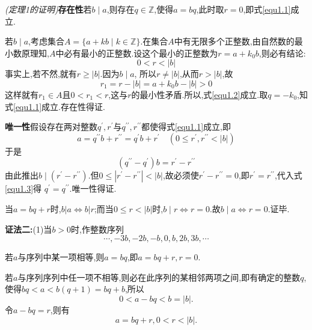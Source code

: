 \proof \textit{(定理1的证明)}\textbf{存在性}\quad 若$b \mid a$,则存在$q \in \mathbb{Z}$,使得$a=b q$,此时取$r=0$,即式\eqref{equ1.1}成立.

若$b\mid a$,考虑集合$A=\{a+k b \mid k \in \mathbb{Z}\}$.在集合$A$中有无限多个正整数,由自然数的最小数原理知,$A$中必有最小的正整数.设这个最小的正整数为$r=a+k_{0} b$,则必有结论:
\begin{equation}\label{equ1.2}
	0<r<|b|
\end{equation}
事实上,若不然,就有$r \geqslant|b|$.因为$b\mid a$, 所以$r \neq|b|$,从而$r>|b|$,故
\begin{equation*}
	r_{1}=r-|b|=a+k_{0} b-|b|>0
\end{equation*}
这样就有$r_{1} \in A$且$0<r_{1}<r$,这与$r$的最小性矛盾.所以,式\eqref{equ1.2}成立.取$q=-k_{0}$,知式\eqref{equ1.1}成立.存在性得证.

\textbf{唯一性}\quad 假设存在两对整数$q^{\prime}, r^{\prime}$与$q^{\prime \prime}, r^{\prime \prime}$都使得式\eqref{equ1.1}成立,即
\begin{equation*}
	a=q^{\prime \prime} b+r^{\prime \prime}=q^{\prime} b+r^{\prime} \quad\left(0 \leqslant r^{\prime}, r^{\prime \prime}<|b|\right)
\end{equation*}
于是
\begin{equation}\label{equ1.3}
	\left(q^{\prime \prime}-q^{\prime}\right) b=r^{\prime}-r^{\prime \prime}
\end{equation}
由此推出$b \mid\left(r^{\prime}-r^{\prime \prime}\right)$.但$0 \leqslant\left|r^{\prime}-r^{\prime \prime}\right|<|b|$,故必须使$r^{\prime}-r^{\prime \prime}=0$,即$r^{\prime}=r^{\prime \prime}$,代入式\eqref{equ1.3}得
$q^{\prime}=q^{\prime \prime}$.唯一性得证.

当$a=b q+r$时,$b|a \Leftrightarrow b| r$;而当$0 \leqslant r<|b|$时,$b \mid r \Leftrightarrow r=0$.故$b \mid a \Leftrightarrow r=0$.证毕.

\textbf{证法二:}(1)当$b>0$时,作整数序列
\begin{equation*}
	\cdots,-3b,-2b,-b,0,b,2b,3b,\cdots
\end{equation*}

若$a$与序列中某一项相等,则$a=bq$,即$a=bq+r,r=0$.

若$a$与序列序列中任一项不相等,则必在此序列的某相邻两项之间,即有确定的整数$q$,使得$bq<a<b(q+1)=bq+b$,所以
\begin{equation*}
	0<a-bq<b=|b|.
\end{equation*}
令$a-bq=r$,则有
\begin{equation*}
	a=bq+r,0<r<|b|.
\end{equation*}

